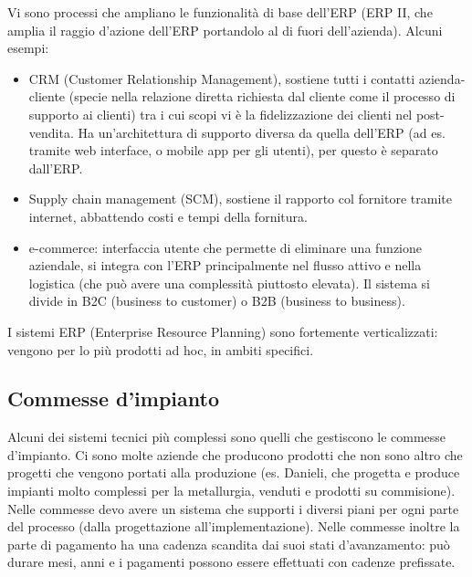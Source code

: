 Vi sono processi che ampliano le funzionalit\`a di base dell'ERP (ERP II,
che amplia il raggio d'azione dell'ERP portandolo al di fuori dell'azienda). Alcuni esempi:
\begin{itemize}
	\item CRM (Customer Relationship Management), sostiene tutti i contatti azienda-cliente (specie nella relazione diretta richiesta dal cliente
	come il processo di supporto ai clienti) tra i cui scopi vi \`e la fidelizzazione dei clienti
	nel post-vendita. Ha un'architettura di supporto diversa da quella dell'ERP (ad es. tramite web interface, o mobile app per gli utenti),
	per questo \`e separato dall'ERP.
	\item Supply chain management (SCM), sostiene il rapporto col fornitore tramite internet,
	abbattendo costi e tempi della fornitura.
	\item e-commerce: interfaccia utente che permette di eliminare una funzione aziendale, si integra con l'ERP
	principalmente nel flusso attivo e nella logistica (che pu\`o avere una complessit\`a piuttosto elevata).
	Il sistema si divide in B2C (business to customer) o B2B (business to business).
\end{itemize}

I sistemi ERP (Enterprise Resource Planning) sono fortemente verticalizzati: vengono
per lo pi\`u prodotti ad hoc, in ambiti specifici.
\subsection{Commesse d'impianto}
\label{sub:Commesse d'impianto}
Alcuni dei sistemi tecnici pi\`u complessi sono quelli che gestiscono
le commesse d'impianto. Ci sono molte aziende che producono prodotti che
non sono altro che progetti che vengono portati alla produzione (es. Danieli,
che progetta e produce impianti molto complessi per la metallurgia, venduti e
prodotti su commisione).\\
Nelle commesse devo avere un sistema che supporti i diversi piani
per ogni parte del processo (dalla progettazione all'implementazione).
Nelle commesse inoltre la parte di pagamento ha una cadenza scandita dai suoi stati
d'avanzamento: pu\`o durare mesi, anni e i pagamenti possono essere
effettuati con cadenze prefissate.\\
